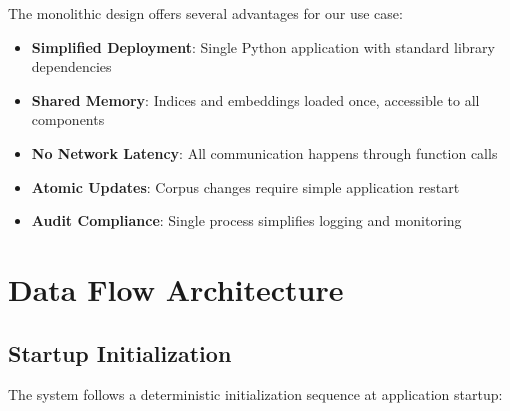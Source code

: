 The monolithic design offers several advantages for our use case:

\begin{itemize}[leftmargin=*,itemsep=2pt,topsep=2pt]
  \item \textbf{Simplified Deployment}: Single Python application with standard library dependencies
  \item \textbf{Shared Memory}: Indices and embeddings loaded once, accessible to all components
  \item \textbf{No Network Latency}: All communication happens through function calls
  \item \textbf{Atomic Updates}: Corpus changes require simple application restart
  \item \textbf{Audit Compliance}: Single process simplifies logging and monitoring
\end{itemize}

\section{Data Flow Architecture}

\subsection{Startup Initialization}

The system follows a deterministic initialization sequence at application startup:

